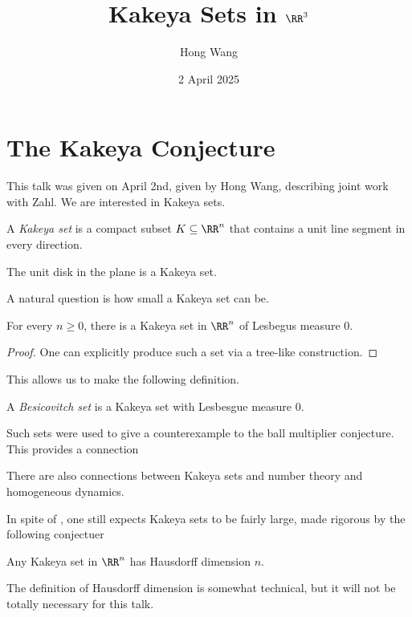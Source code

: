 \documentclass{article}
\title{Kakeya Sets in \texorpdfstring{$\RR^3$}{R3}}
\author{Hong Wang}
\date{2 April 2025}
\begin{document}
\maketitle

\tableofcontents

\section{The Kakeya Conjecture}
This talk was given on April 2nd, given by Hong Wang, describing joint work with Zahl. We are interested in Kakeya sets.
\begin{definition}
	A \textit{Kakeya set} is a compact subset $K\subseteq\RR^n$ that contains a unit line segment in every direction.
\end{definition}
\begin{example}
	The unit disk in the plane is a Kakeya set.
\end{example}
A natural question is how small a Kakeya set can be.
\begin{theorem}[Besicovitch 1919] \label{thm:besico}
	For every $n\ge0$, there is a Kakeya set in $\RR^n$ of Lesbegus measure $0$.
\end{theorem}
\begin{proof}
	One can explicitly produce such a set via a tree-like construction.
\end{proof}
This allows us to make the following definition.
\begin{definition}[Besicovitch]
	A \textit{Besicovitch set} is a Kakeya set with Lesbesgue measure $0$.
\end{definition}
\begin{remark}[Fefferman 1970]
	Such sets were used to give a counterexample to the ball multiplier conjecture. This provides a connection
\end{remark}
\begin{remark}
	There are also connections between Kakeya sets and number theory and homogeneous dynamics.
\end{remark}
In spite of , one still expects Kakeya sets to be fairly large, made rigorous by the following conjectuer
\begin{conj}[Kakeya]
	Any Kakeya set in $\RR^n$ has Hausdorff dimension $n$.
\end{conj}
The definition of Hausdorff dimension is somewhat technical, but it will not be totally necessary for this talk.
\end{document}
